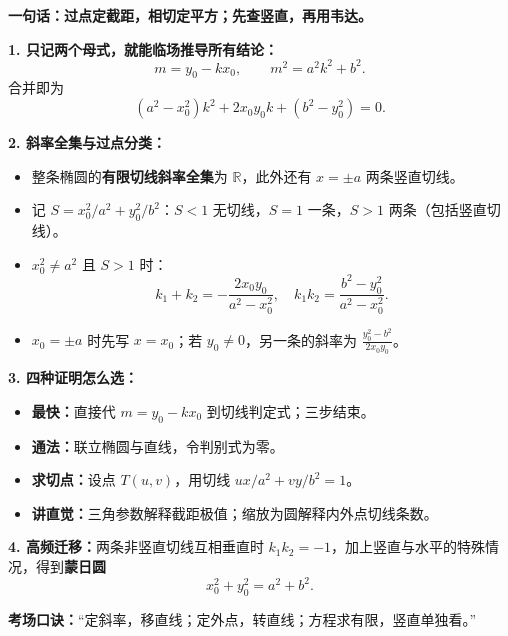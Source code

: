 \begin{summarybox}
\textbf{一句话：过点定截距，相切定平方；先查竖直，再用韦达。}

\textbf{1. 只记两个母式，就能临场推导所有结论：}
\[
\boxed{m=y_0-kx_0},\qquad
\boxed{m^2=a^2k^2+b^2}.
\]
合并即为
\[
\boxed{(a^2-x_0^2)k^2+2x_0y_0k+(b^2-y_0^2)=0.}
\]

\textbf{2. 斜率全集与过点分类：}
\begin{itemize}
\item 整条椭圆的\textbf{有限切线斜率全集}为 $\mathbb R$，此外还有 $x=\pm a$ 两条竖直切线。
\item 记 $S=x_0^2/a^2+y_0^2/b^2$：$S<1$ 无切线，$S=1$ 一条，$S>1$ 两条（包括竖直切线）。
\item $x_0^2\ne a^2$ 且 $S>1$ 时：
\[
k_1+k_2=-\frac{2x_0y_0}{a^2-x_0^2},\quad
k_1k_2=\frac{b^2-y_0^2}{a^2-x_0^2}.
\]
\item $x_0=\pm a$ 时先写 $x=x_0$；若 $y_0\ne0$，另一条的斜率为 $\frac{y_0^2-b^2}{2x_0y_0}$。
\end{itemize}

\textbf{3. 四种证明怎么选：}
\begin{itemize}
\item \textbf{最快：}直接代 $m=y_0-kx_0$ 到切线判定式；三步结束。
\item \textbf{通法：}联立椭圆与直线，令判别式为零。
\item \textbf{求切点：}设点 $T(u,v)$，用切线 $ux/a^2+vy/b^2=1$。
\item \textbf{讲直觉：}三角参数解释截距极值；缩放为圆解释内外点切线条数。
\end{itemize}

\textbf{4. 高频迁移：}两条非竖直切线互相垂直时 $k_1k_2=-1$，加上竖直与水平的特殊情况，得到\textbf{蒙日圆}
\[
\boxed{x_0^2+y_0^2=a^2+b^2}.
\]

\textbf{考场口诀：}“定斜率，移直线；定外点，转直线；方程求有限，竖直单独看。”
\end{summarybox}
